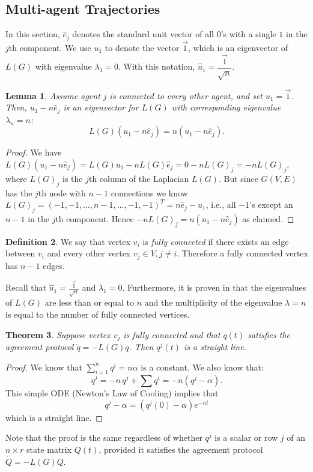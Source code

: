 \documentclass{aims}
\newtheorem{theorem}{Theorem}[section]
\newtheorem{lemma}[theorem]{Lemma}
\theoremstyle{definition}
\newtheorem{definition}[theorem]{Definition}
\begin{document}
\subsection{Multi-agent Trajectories}
In this section, $\hat{e}_j$ denotes the standard unit vector of all $0$'s
with a single $1$ in the $j$th component. We use $u_1$ to denote the vector $\vec 1$, which is an eigenvector of $L(G)$ with eigenvalue $\lambda_1=0$. With this notation, $\hat{u}_1=\dfrac{\vec 1}{\sqrt{n}}$.
\begin{lemma}
\label{lemma1-th1}
Assume agent $j$ is connected to every other agent, and set $u_1=\vec 1$. Then, $u_1-n\hat{e}_j$ is an eigenvector for $L(G)$ with corresponding eigenvalue $\lambda_n=n$:
\begin{equation}
    L(G)(u_1-n\hat{e}_j)=n(u_1-n\hat{e}_j).
\end{equation}
\end{lemma}
\begin{proof}
We have $L(G)(u_1-n\hat{e}_j)=L(G)u_1-nL(G)\hat{e}_j=0-nL(G)_j=-nL(G)_j$, where $L(G)_j$ is the $j$th column of the Laplacian $L(G)$.
But since $G(V,E)$ has the $j$th node with $n-1$ connections
we know $L(G)_j=(-1,-1,\dots,n-1,\dots,-1,-1)^T=n \hat{e}_j-u_1$, i.e.,
all $-1$'s except an $n-1$ in the $j$th component.
Hence $-n L(G)_j=n(u_1 - n\hat{e}_j)$
as claimed.

\end{proof}

\begin{definition}
We say that vertex $v_i$ is \emph{fully connected} if there exists an edge between $v_i$ and every other vertex $v_j\in V, j\neq i$. Therefore a fully connected vertex has $n-1$ edges. 
\end{definition}
Recall that $\hat{u}_1=\frac{\vec 1}{\sqrt{n}}$ and $\lambda_1=0$.
Furthermore, it is proven in \cite{Eigenvalues} that the eigenvalues of $L(G)$ are less than or equal to $n$ and the multiplicity of the eigenvalue $\lambda=n$ is equal to the number of fully connected vertices.
\begin{theorem}\label{thm: connected graph}
Suppose vertex $v_j$ is fully connected and that $q(t)$ satisfies the agreement protocol $\dot{q}=-L(G)q$. Then $q^j(t)$ is a straight line. 
\end{theorem}
\begin{proof}
We know that $\displaystyle\sum_{i=1}^n q^i=n\alpha$ is a constant. We also know that:
\begin{equation}
\dot{q}^j=-n\,q^j+\sum q^i=-n(q^j-\alpha).
\end{equation}
This simple ODE (Newton's Law of Cooling) implies that \begin{equation}
    q^j-\alpha=(q^j(0)-\alpha)e^{-nt}
\end{equation} which is a straight line.
\end{proof}
Note that the proof is the same regardless of whether $q^j$ is a scalar or row $j$ of an $n\times r$ state matrix $Q(t)$, provided it satisfies the agreement protocol $\dot{Q}=-L(G) Q$.
\end{document}
